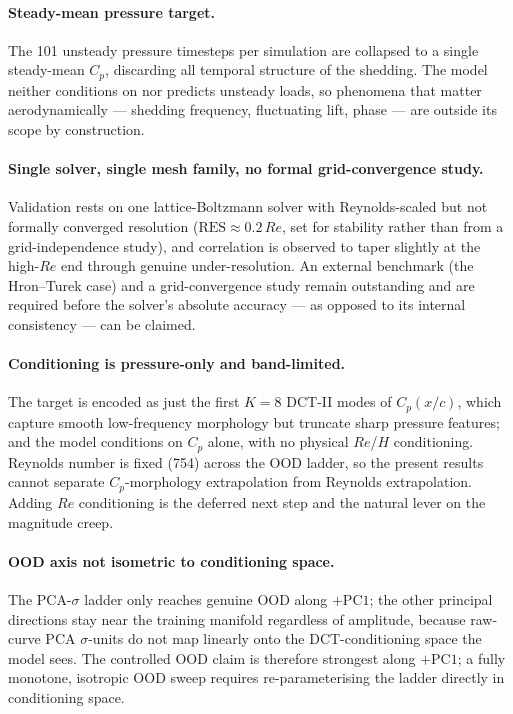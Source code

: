 \paragraph{Steady-mean pressure target.} The 101 unsteady pressure timesteps per simulation are
collapsed to a single steady-mean $C_p$, discarding all temporal structure of the shedding. The model
neither conditions on nor predicts unsteady loads, so phenomena that matter aerodynamically ---
shedding frequency, fluctuating lift, phase --- are outside its scope by construction.

\paragraph{Single solver, single mesh family, no formal grid-convergence study.} Validation rests on
one lattice-Boltzmann solver with Reynolds-scaled but not formally converged resolution
($\mathrm{RES} \approx 0.2\,Re$, set for stability rather than from a grid-independence study), and
correlation is observed to taper slightly at the high-$Re$ end through genuine under-resolution. An
external benchmark (the Hron--Turek case) and a grid-convergence study remain outstanding and are
required before the solver's absolute accuracy --- as opposed to its internal consistency --- can be
claimed.

\paragraph{Conditioning is pressure-only and band-limited.} The target is encoded as just the first
$K = 8$ DCT-II modes of $C_p(x/c)$, which capture smooth low-frequency morphology but truncate sharp
pressure features; and the model conditions on $C_p$ alone, with no physical $Re$/$H$ conditioning.
Reynolds number is fixed (754) across the OOD ladder, so the present results cannot separate
$C_p$-morphology extrapolation from Reynolds extrapolation. Adding $Re$ conditioning is the deferred
next step and the natural lever on the magnitude creep.

\paragraph{OOD axis not isometric to conditioning space.} The PCA-$\sigma$ ladder only reaches genuine
OOD along $+\mathrm{PC1}$; the other principal directions stay near the training manifold regardless of
amplitude, because raw-curve PCA $\sigma$-units do not map linearly onto the DCT-conditioning space the
model sees. The controlled OOD claim is therefore strongest along $+\mathrm{PC1}$; a fully monotone,
isotropic OOD sweep requires re-parameterising the ladder directly in conditioning space.

